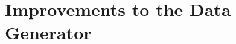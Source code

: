 \documentclass[conference]{IEEEtran}
\begin{document}



\section{Improvements to the Data Generator}



\end{document}
